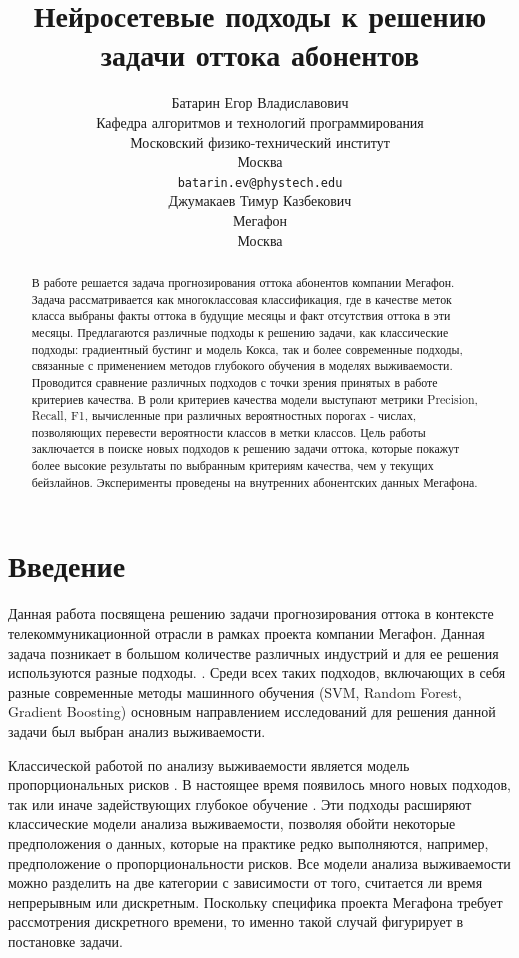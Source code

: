 \documentclass{article}
\title{Нейросетевые подходы к решению задачи оттока абонентов}
\author{ Батарин Егор Владиславович \\
	Кафедра алгоритмов и технологий программирования \\
	Московский физико-технический институт\\
	Москва \\
	\texttt{batarin.ev@phystech.edu} \\
	\And
	Джумакаев Тимур Казбекович \\
	Мегафон\\
	Москва\\
}
\date{}
\begin{document}
\maketitle

\begin{abstract}

В работе решается задача прогнозирования оттока абонентов компании Мегафон. Задача рассматривается как многоклассовая классификация, где в качестве меток класса выбраны факты оттока в будущие месяцы и факт отсутствия оттока в эти месяцы. Предлагаются различные подходы к решению задачи, как классические подходы: градиентный бустинг и модель Кокса, так и более современные подходы, связанные с применением методов глубокого обучения в моделях выживаемости. Проводится сравнение различных подходов с точки зрения принятых в работе критериев качества. В роли критериев качества модели выступают метрики Precision, Recall, F1, вычисленные при различных вероятностных порогах - числах, позволяющих перевести вероятности классов в метки классов. Цель работы заключается в поиске новых подходов к решению задачи оттока, которые покажут более высокие результаты по выбранным критериям качества, чем у текущих бейзлайнов. Эксперименты проведены на внутренних абонентских данных Мегафона.   

\end{abstract}



\section{Введение}

Данная работа посвящена решению задачи прогнозирования оттока в контексте телекоммуникационной отрасли в рамках проекта компании Мегафон. Данная задача позникает в большом количестве различных индустрий и для ее решения используются разные подходы. \cite{Ahn2020}. Среди всех таких подходов, включающих в себя разные современные методы машинного обучения (SVM, Random Forest, Gradient Boosting) основным направлением исследований для решения данной задачи был выбран анализ выживаемости. 

Классической работой по анализу выживаемости является модель пропорциональных рисков \cite{Cox1972}. В настоящее время появилось много новых подходов, так или иначе задействующих глубокое обучение \cite{Wiegrebe2024}. Эти подходы расширяют классические модели анализа выживаемости, позволяя обойти некоторые предположения о данных, которые на практике редко выполняются, например, предположение о пропорциональности рисков. Все модели анализа выживаемости можно разделить на две категории с зависимости от того, считается ли время непрерывным или дискретным. Поскольку специфика проекта Мегафона требует рассмотрения дискретного времени, то именно такой случай фигурирует в постановке задачи. 
\end{document}
